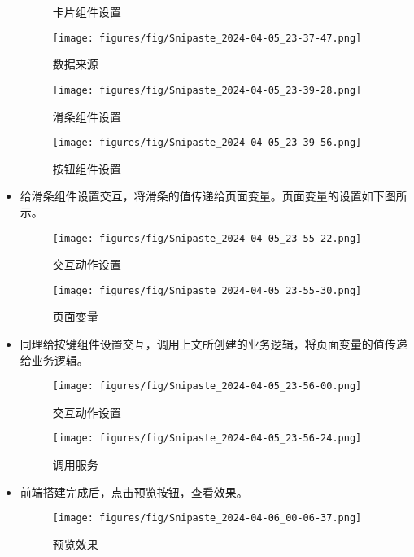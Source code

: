 \documentclass[12pt,hyperref,a4paper,UTF8]{ctexart}
\begin{document}
\begin{itemize}
\begin{figure}[H]
\begin{minipage}{.22\textwidth}
      \caption{\footnotesize 卡片组件设置}
      \label{fig:image1}
    \end{minipage}%
    \begin{minipage}{.22\textwidth}
      \centering
      \texttt{[image: figures/fig/Snipaste\_2024-04-05\_23-37-47.png]}
      \caption{\footnotesize 数据来源}
      \label{fig:image2}
    \end{minipage}
    \begin{minipage}{.22\textwidth}
      \centering
      \texttt{[image: figures/fig/Snipaste\_2024-04-05\_23-39-28.png]}
      \caption{\footnotesize 滑条组件设置}
      \label{fig:image2}
    \end{minipage}
    \begin{minipage}{.22\textwidth}
      \centering
      \texttt{[image: figures/fig/Snipaste\_2024-04-05\_23-39-56.png]}
      \caption{\footnotesize 按钮组件设置}
      \label{fig:image2}
    \end{minipage}
  \end{figure}


  \item 给滑条组件设置交互，将滑条的值传递给页面变量。页面变量的设置如下图所示。
  \begin{figure}[H]
    \centering
    \begin{minipage}{.3\textwidth}
      \centering
      \texttt{[image: figures/fig/Snipaste\_2024-04-05\_23-55-22.png]}
      \caption{\small 交互动作设置}
      \label{fig:image1}
    \end{minipage}%
    \begin{minipage}{.6\textwidth}
      \centering
      \texttt{[image: figures/fig/Snipaste\_2024-04-05\_23-55-30.png]}
      \caption{\small 页面变量}
      \label{fig:image2}
    \end{minipage}
  \end{figure}

  \item 同理给按键组件设置交互，调用上文所创建的业务逻辑，将页面变量的值传递给业务逻辑。
  \begin{figure}[H]
    \centering
    \begin{minipage}{.4\textwidth}
      \centering
      \texttt{[image: figures/fig/Snipaste\_2024-04-05\_23-56-00.png]}
      \caption{\small 交互动作设置}
      \label{fig:image1}
    \end{minipage}%
    \begin{minipage}{.4\textwidth}
      \centering
      \texttt{[image: figures/fig/Snipaste\_2024-04-05\_23-56-24.png]}
      \caption{\small 调用服务}
      \label{fig:image2}
    \end{minipage}
  \end{figure}
  \item 前端搭建完成后，点击预览按钮，查看效果。
  \begin{figure}[H]
    \centering
    \texttt{[image: figures/fig/Snipaste\_2024-04-06\_00-06-37.png]}
    \caption{预览效果}
    \label{fig:enter-label}
  \end{figure}


\end{itemize}
\end{document}

